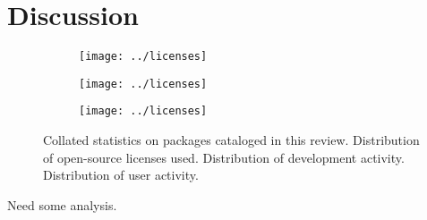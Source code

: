 \section{Discussion}

\begin{figure*}
\centering
\begin{subfigure}[t]{.3\linewidth}
\centering \label{licenses}
\texttt{[image: ../licenses]}
\end{subfigure}

\begin{subfigure}[t]{.3\linewidth}
\centering \label{licenses}
\texttt{[image: ../licenses]}
\end{subfigure}

\begin{subfigure}[t]{.3\linewidth}
\centering \label{licenses}
\texttt{[image: ../licenses]}
\end{subfigure}

\caption{\label{pies} Collated statistics on packages cataloged in this review.  Distribution of open-source licenses used.
 Distribution of development activity.  Distribution of user activity.
}
\end{figure*}

Need some analysis.